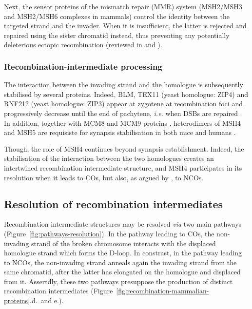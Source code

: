Next, the sensor proteins of the mismatch repair (MMR) system (MSH2/MSH3 and MSH2/MSH6 complexes in mammals) control the identity between the targeted strand and the invader.
When it is insufficient, the latter is rejected and repaired using the sister chromatid instead, thus preventing any potentially deleterious ectopic recombination (reviewed in \citealp{surtees2004mismatch} and \citealp{goldfarb2010frequent}).


\subsubsection{Recombination-intermediate processing}
The interaction between the invading strand and the homologue is subsequently stabilised by several proteins.
Indeed, BLM, TEX11 (yeast homologue: ZIP4) and RNF212 (yeast homologue: ZIP3) appear at zygotene at recombination foci and progressively decrease until the end of pachytene, \textit{i.e.} when DSBs are repaired \citep[reviewed in][]{baudat2013meiotic}. 
In addition, together with MCM8 and MCM9 proteins \citep{lutzmann2012mcm8}, heterodimers of MSH4 and MSH5 \citep{scully1997association} are requisiste for synapsis stabilisation in both mice \citep{devries1999mouse,kneitz2000muts} and humans \citep{snowden2004hmsh4hmsh5}.

Though, the role of MSH4 continues beyond synapsis establishment. 
Indeed, the stabilisation of the interaction between the two homologues creates an intertwined recombination intermediate structure, and MSH4 participates in its resolution when it leads to COs, but also, as argued by \citet{baudat2007regulating}, to NCOs.





\subsection{Resolution of recombination intermediates}
\label{chap2:resolution-intermediates}

Recombination intermediate structures may be resolved \textit{via} two main pathways (Figure~\ref{fig:pathways-resolution}).
In the pathway leading to COs, the non-invading strand of the broken chromosome interacts with the displaced homologue strand which forms the D-loop.
In constrast, in the pathway leading to NCOs, the non-invading strand anneals again the invading strand from the same chromatid, after the latter has elongated on the homologue and displaced from it.
Assertdly, these two pathways presuppose the production of distinct recombination intermediates (Figure~\ref{fig:recombination-mammalian-proteins}.d.\ and e.).


